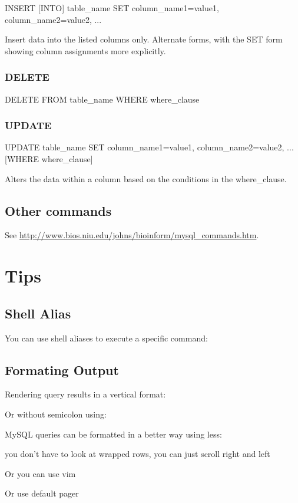 \begin{sqlcode}[INSERT table SET Column=Value]
INSERT [INTO] table_name SET column_name1=value1, column_name2=value2, ...
\end{sqlcode}

Insert data into the listed columns only. Alternate forms, with the SET form showing column assignments more explicitly.
\subsubsection{DELETE}
\begin{sqlcode}
DELETE FROM table_name WHERE where_clause
\end{sqlcode}

\subsubsection{UPDATE}
\begin{sqlcode}[UPDATE table SET column=value]
UPDATE table_name SET column_name1=value1, column_name2=value2, ... [WHERE where_clause]
\end{sqlcode}
Alters the data within a column based on the conditions in the where\_clause.
\subsection{Other commands}
See \url{http://www.bios.niu.edu/johns/bioinform/mysql_commands.htm}.
\section {Tips}
\subsection{Shell Alias}
You can use shell aliases to execute a specific command:

\subsection{Formating Output}

Rendering query results in a vertical format:


Or without semicolon using:


MySQL queries can be formatted in a better way using less:


you don’t have to look at wrapped rows, you can just scroll right and left


Or you can use vim


Or use default pager
